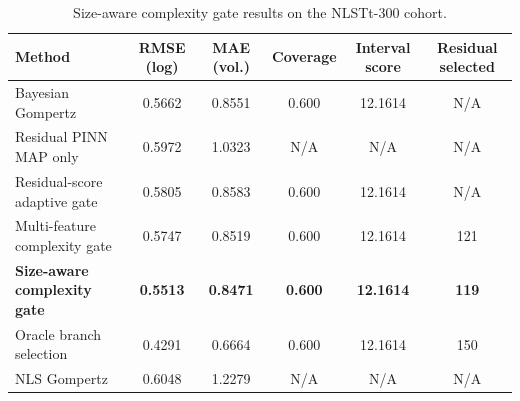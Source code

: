 \begin{table}[t]
\centering
\caption{Size-aware complexity gate results on the NLSTt-300 cohort.}
\begin{tabular}{lccccc}
\toprule
Method & RMSE (log) & MAE (vol.) & Coverage & Interval score & Residual selected \\
\midrule
Bayesian Gompertz & 0.5662 & 0.8551 & 0.600 & 12.1614 & N/A \\
Residual PINN MAP only & 0.5972 & 1.0323 & N/A & N/A & N/A \\
Residual-score adaptive gate & 0.5805 & 0.8583 & 0.600 & 12.1614 & N/A \\
Multi-feature complexity gate & 0.5747 & 0.8519 & 0.600 & 12.1614 & 121 \\
\textbf{Size-aware complexity gate} & \textbf{0.5513} & \textbf{0.8471} & \textbf{0.600} & \textbf{12.1614} & \textbf{119} \\
Oracle branch selection & 0.4291 & 0.6664 & 0.600 & 12.1614 & 150 \\
NLS Gompertz & 0.6048 & 1.2279 & N/A & N/A & N/A \\
\bottomrule
\end{tabular}
\end{table}
